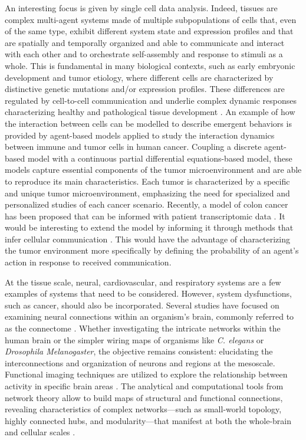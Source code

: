 \documentclass[12pt]{article}
\renewcommand{\(}{\left(}
\renewcommand{\)}{\right)}
\renewcommand{\[}{\left[}
\renewcommand{\]}{\right]}
\begin{document}
An interesting focus is given by single cell data analysis. Indeed, tissues are complex multi-agent systems made of multiple subpopulations of cells that, even of the same type, exhibit different system state and expression profiles and that are spatially and temporally organized and able to communicate and interact with each other and to orchestrate self-assembly and response to stimuli as a whole. This is fundamental in many biological contexts, such as early embryonic development and tumor etiology, where different cells are characterized by distinctive genetic mutations and/or expression profiles. These differences are regulated by cell-to-cell communication and underlie complex dynamic responses characterizing healthy and pathological tissue development \cite{shalek2014single}.
An example of how the interaction between cells can be modelled to describe emergent behaviors is provided by agent-based models applied to study the interaction dynamics between immune and tumor cells in human cancer. Coupling a discrete agent-based model with a continuous partial differential equations-based model, these models capture essential components of the tumor microenvironment and are able to reproduce its main characteristics. Each tumor is characterized by a specific and unique tumor microenvironment, emphasizing the need for specialized and personalized studies of each cancer scenario. Recently, a model of colon cancer has been proposed  that can be informed with patient transcriptomic data \cite{cesaro2022mast}. It would be interesting to extend the model by informing it through methods that infer cellular communication \cite{baruzzo2022identify, kumar2018analysis, puram2017single, zhang2019landscape}. This would have the advantage of characterizing the tumor environment more specifically by defining the probability of an agent's action in response to received communication.


At the tissue scale, neural, cardiovascular, and respiratory systems are a few examples of systems that need to be considered. However, system dysfunctions, such as cancer, should also be incorporated. 
Several studies have focused on examining neural connections within an organism's brain, commonly referred to as the connectome \cite{Sporns2005}. Whether investigating the intricate networks within the human brain or the simpler wiring maps of organisms like \emph{C. elegans} or \emph{Drosophila Melanogaster}, the objective remains consistent: elucidating the interconnections and organization of neurons and regions at the mesoscale. Functional imaging techniques are utilized to explore the relationship between activity in specific brain areas \cite{bullmore_complex_2009}. The analytical and computational tools from network theory allow to build maps of structural and functional connections, revealing characteristics of complex networks—such as small-world topology, highly connected hubs, and modularity—that manifest at both the whole-brain and cellular scales \cite{Sporns2002, Sporns2004,Chialvo2010}. 
\end{document}
